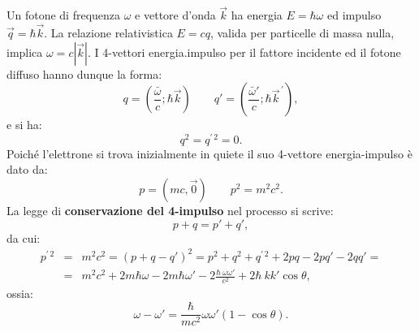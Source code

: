 \documentclass[a4paper,12pt,oneside]{book}
\begin{document}
Un fotone di frequenza $\omega$ e vettore d'onda $\vec{k}$ ha energia $E = \hbar \omega$ ed impulso $\vec{q}= \hbar \vec{k}$. La relazione relativistica $E=cq$, valida per particelle di massa nulla, implica $\omega = c|\vec{k}|$. I 4-vettori energia.impulso per il fattore incidente ed il fotone diffuso hanno dunque la forma:
	\begin{equation}
		q=\left(\frac{\bar \omega}{c}; \hbar \vec{k} \right)\qquad q' = \left(\frac{\bar \omega'}{c}; \hbar {\vec{k}}^{\, \prime}\right),
	\end{equation}
e si ha:
	\begin{equation}
		q^2 = q^{\prime \, 2}=0.
	\end{equation}
Poiché l'elettrone si trova inizialmente in quiete il suo 4-vettore energia-impulso è dato da:
	\begin{equation}
		p=\left(mc, \vec{0} \right)\qquad p^2 =m^2 c^2.
	\end{equation}
La legge di \textbf{conservazione del 4-impulso} nel processo si scrive:
	\begin{equation}
		p+q=p'+q',
	\end{equation}
da cui:
	\begin{eqnarray}
	p^{\prime \, 2} &=& m^2 c^2 = \left( p +q -q'\right)^2= p^2 + q^2 +q^{\prime \, 2}+ 2pq - 2pq' -2 qq'= \nonumber \\
	&=& m^2c^2 + 2m\hbar \omega - 2m \hbar \omega ' - 2 \frac{\hbar \ \omega \omega '}{c^2}+2 \hbar \ k k'  \cos \theta ,
	\end{eqnarray}
ossia:
	\begin{equation}
		\boxed{
			\omega - \omega ' =\frac{\hbar}{m c^2} \omega \omega ' \left( 1-\cos \theta \right).
			}
	\label{eq:cap1_3}
	\end{equation}
\end{document}
